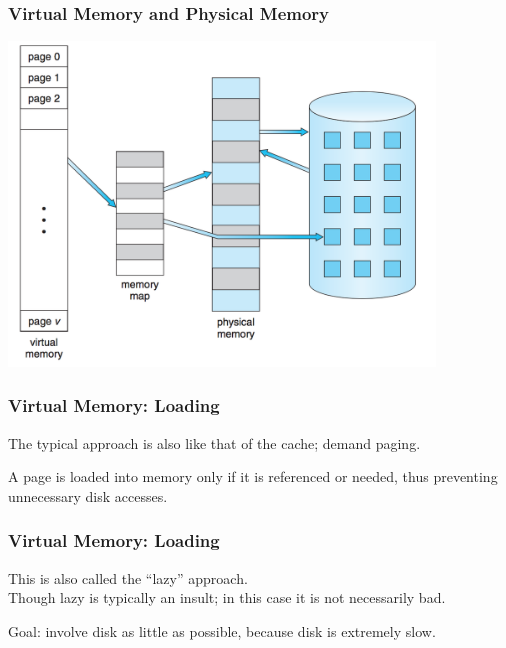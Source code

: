 \begin{frame}
\frametitle{Virtual Memory and Physical Memory}

\begin{center}
\includegraphics[width=0.85\textwidth]{images/vmem-physmem.png}
\end{center}

\end{frame}

\begin{frame}
\frametitle{Virtual Memory: Loading}

The typical approach is also like that of the cache; demand paging. 

A page is loaded into memory only if it is referenced or needed, thus preventing unnecessary disk accesses. 

\end{frame}

\begin{frame}
\frametitle{Virtual Memory: Loading}

This is also called the ``lazy'' approach.\\
\quad Though lazy is typically an insult; in this case it is not necessarily bad.  

Goal: involve disk as little as possible, because disk is extremely slow.


\end{frame}

